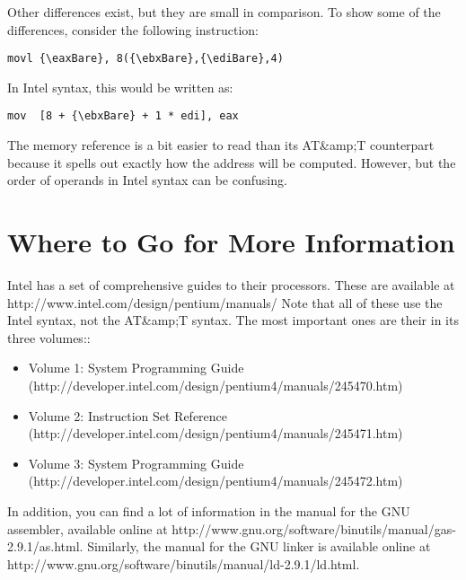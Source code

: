 Other differences exist, but they are small in comparison.  To show some
of the differences, consider the following instruction:

\begin{simpletyping}
\begin{lstlisting}
movl {\eaxBare}, 8({\ebxBare},{\ediBare},4)
\end{lstlisting}
\end{simpletyping}

In Intel syntax, this would be written as:

\begin{simpletyping}
\begin{lstlisting}
mov  [8 + {\ebxBare} + 1 * edi], eax
\end{lstlisting}
\end{simpletyping}

The memory reference is a bit easier to read than its AT&amp;T counterpart
because it spells out exactly how the address
will be computed.  However, but the order of operands in Intel syntax can be 
confusing.

\section{Where to Go for More Information}

Intel has a set of comprehensive guides to their processors.  These
are available at http://www.intel.com/design/pentium/manuals/  Note that
all of these use the Intel syntax, not the AT&amp;T syntax.  The most important
ones are their 
in its three volumes::

\begin{itemize}\item Volume 1: System Programming Guide (http://developer.intel.com/design/pentium4/manuals/245470.htm) 
\item Volume 2: Instruction Set Reference (http://developer.intel.com/design/pentium4/manuals/245471.htm) 
\item Volume 3: System Programming Guide (http://developer.intel.com/design/pentium4/manuals/245472.htm) 
\end{itemize}

In addition, you can find a lot of information in the manual for the GNU assembler, available online at http://www.gnu.org/software/binutils/manual/gas-2.9.1/as.html.  Similarly, the manual for the GNU linker is available online at http://www.gnu.org/software/binutils/manual/ld-2.9.1/ld.html.

